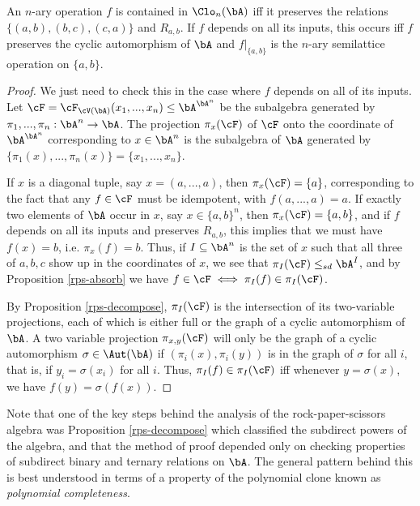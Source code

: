 \begin{thm} An $n$-ary operation $f$ is contained in $\Clo_n(\bA)$ iff it preserves the relations $\{(a,b),(b,c),(c,a)\}$ and $R_{a,b}$. If $f$ depends on all its inputs, this occurs iff $f$ preserves the cyclic automorphism of $\bA$ and $f|_{\{a,b\}}$ is the $n$-ary semilattice operation on $\{a,b\}$.
\end{thm}
\begin{proof} We just need to check this in the case where $f$ depends on all of its inputs. Let $\cF = \cF_{\cV(\bA)}(x_1, ..., x_n) \le \bA^{\bA^n}$ be the subalgebra generated by $\pi_1, ..., \pi_n : \bA^n \rightarrow \bA$. The projection $\pi_x(\cF)$ of $\cF$ onto the coordinate of $\bA^{\bA^n}$ corresponding to $x \in \bA^n$ is the subalgebra of $\bA$ generated by $\{\pi_1(x), ..., \pi_n(x)\} = \{x_1, ..., x_n\}$.

If $x$ is a diagonal tuple, say $x = (a,...,a)$, then $\pi_x(\cF) = \{a\}$, corresponding to the fact that any $f \in \cF$ must be idempotent, with $f(a,...,a) = a$. If exactly two elements of $\bA$ occur in $x$, say $x \in \{a,b\}^n$, then $\pi_x(\cF) = \{a,b\}$, and if $f$ depends on all its inputs and preserves $R_{a,b}$, this implies that we must have $f(x) = b$, i.e. $\pi_x(f) = b$. Thus, if $I \subseteq \bA^n$ is the set of $x$ such that all three of $a,b,c$ show up in the coordinates of $x$, we see that $\pi_I(\cF) \le_{sd} \bA^I$, and by Proposition \ref{rps-absorb} we have $f \in \cF \iff \pi_I(f) \in \pi_I(\cF)$.

By Proposition \ref{rps-decompose}, $\pi_I(\cF)$ is the intersection of its two-variable projections, each of which is either full or the graph of a cyclic automorphism of $\bA$. A two variable projection $\pi_{x,y}(\cF)$ will only be the graph of a cyclic automorphism $\sigma \in \Aut(\bA)$ if $(\pi_i(x),\pi_i(y))$ is in the graph of $\sigma$ for all $i$, that is, if $y_i = \sigma(x_i)$ for all $i$. Thus, $\pi_I(f) \in \pi_I(\cF)$ iff whenever $y = \sigma(x)$, we have $f(y) = \sigma(f(x))$.
\end{proof}

Note that one of the key steps behind the analysis of the rock-paper-scissors algebra was Proposition \ref{rps-decompose} which classified the subdirect powers of the algebra, and that the method of proof depended only on checking properties of subdirect binary and ternary relations on $\bA$. The general pattern behind this is best understood in terms of a property of the polynomial clone known as \emph{polynomial completeness}.

